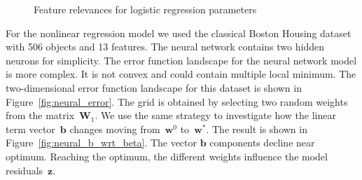 \documentclass[
11pt,%
tightenlines,%
twoside,%
onecolumn,%
nofloats,%
nobibnotes,%
nofootinbib,%
superscriptaddress,%
noshowpacs,%
centertags]%
{revtex4}
\newcommand{\bb}{\mathbf{b}}
\newcommand{\bw}{\mathbf{w}}
\newcommand{\bz}{\mathbf{z}}
\newcommand{\bW}{\mathbf{W}}
\begin{document}
\begin{figure}
\begin{minipage}{.5\textwidth}
		\caption{Feature relevances for logistic regression parameters}
		\label{fig:log_reg_b_wrt_beta}
	\end{minipage}
\end{figure}

For the nonlinear regression model we used the classical Boston Housing dataset with 506 objects and 13 features.
The neural network contains two hidden neurons for simplicity.
The error function landscape for the neural network model is more complex. 
It is not convex and could contain multiple local minimum.
The two-dimensional error function landscape for this dataset is shown in Figure~\ref{fig:neural_error}. 
The grid is obtained by selecting two random weights from the matrix~$\bW_1$.
We use the same strategy to investigate how the linear term vector~$\bb$ changes moving from~$\bw^0$ to~$\bw^*$. 
The result is shown in Figure~\ref{fig:neural_b_wrt_beta}.
The vector $\bb$ components decline near optimum. 
Reaching the optimum, the different weights influence the model residuals~$\bz$.
\end{document}
